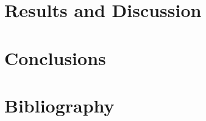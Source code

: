 \documentclass[10pt,twoside]{book}
\begin{document}
\chapter{Results and Discussion}
\clearpage

\clearpage

\chapter{Conclusions}
\clearpage


\chapter{Bibliography}
\clearpage
\begin{multicols}{2}
\printbibliography[heading=none]
\end{multicols}

% 
\end{document}
